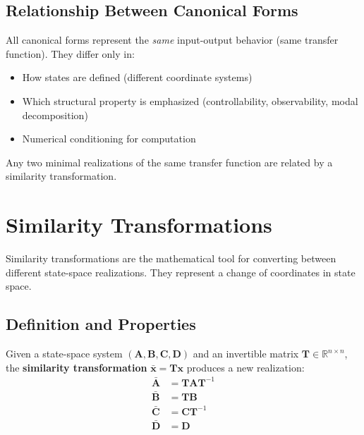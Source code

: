 \subsection{Relationship Between Canonical Forms}

All canonical forms represent the \textit{same} input-output behavior (same transfer function). They differ only in:
\begin{itemize}
    \item How states are defined (different coordinate systems)
    \item Which structural property is emphasized (controllability, observability, modal decomposition)
    \item Numerical conditioning for computation
\end{itemize}

Any two minimal realizations of the same transfer function are related by a similarity transformation.

\section{Similarity Transformations}
\label{sec:similarity_transformations}

Similarity transformations are the mathematical tool for converting between different state-space realizations. They represent a change of coordinates in state space.

\subsection{Definition and Properties}

\begin{definition}
Given a state-space system $(\mathbf{A}, \mathbf{B}, \mathbf{C}, \mathbf{D})$ and an invertible matrix $\mathbf{T} \in \mathbb{R}^{n \times n}$, the \textbf{similarity transformation} $\bar{\mathbf{x}} = \mathbf{T}\mathbf{x}$ produces a new realization:
\begin{align}
\bar{\mathbf{A}} &= \mathbf{T}\mathbf{A}\mathbf{T}^{-1} \\
\bar{\mathbf{B}} &= \mathbf{T}\mathbf{B} \\
\bar{\mathbf{C}} &= \mathbf{C}\mathbf{T}^{-1} \\
\bar{\mathbf{D}} &= \mathbf{D}
\end{align}
\end{definition}

